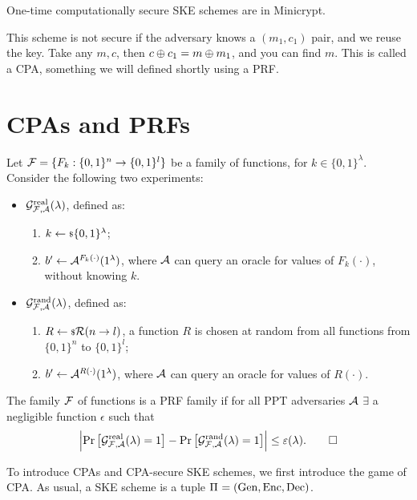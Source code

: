 \begin{corollary}
	One-time computationally secure \ac{SKE} schemes are in Minicrypt.
\end{corollary}

This scheme is not secure if the adversary knows a $(m_1, c_1)$ pair, and we reuse the key.
Take any $m, c$, then $c \oplus c_1 = m \oplus m_1$, and you can find $m$.
This is called a \ac{CPA}, something we will defined shortly using a \ac{PRF}.

\section{\aclp{CPA} and \aclp{PRF}}

\begin{definition}
	Let $\mathcal{F} = \{ F_k : \{0,1\}^{n} \to \{0,1\}^{l} \}$ be a family of functions, for $k \in \{0,1\}^{\lambda}$.
	Consider the following two experiments:
	\begin{itemize}
		\item $\mathcal{G}^{\scriptstyle \text{real}}_{\mathcal{F}, \mathcal{A}}(\lambda)$, defined as:
			\begin{enumerate}
				\item $k \leftarrow {\scriptstyle \$} {\{0,1\}^{\lambda}}$;
				\item $b' \leftarrow \mathcal{A}^{F_k(\cdot)}(1^{\lambda})$, where $\mathcal{A}$ can query an oracle for values of $F_k(\cdot)$, without knowing $k$.
			\end{enumerate}
		\item $\mathcal{G}^{\scriptstyle \text{rand}}_{\mathcal{F}, \mathcal{A}}(\lambda)$, defined as:
			\begin{enumerate}
				\item $R \leftarrow {\scriptstyle \$} {\mathcal{R}(n \to l)}$, \ie a function $R$ is chosen at random from all functions from $\{0,1\}^{n}$ to $\{0,1\}^{l}$;
				\item $b' \leftarrow \mathcal{A}^{R(\cdot)}(1^{\lambda})$, where $\mathcal{A}$ can query an oracle for values of $R(\cdot)$.
			\end{enumerate}
	\end{itemize}
	The family $\mathcal{F}$ of functions is a \ac{PRF} family if for all \ac{PPT} adversaries $\mathcal{A}$ $\exists$ a negligible function $\epsilon$ such that
	\begin{equation*}
		\left|{
			\mathop{\mathrm{Pr}}\limits_{} \left[ {\mathcal{G}^{\scriptstyle \text{real}}_{\mathcal{F}, \mathcal{A}}(\lambda) = 1} \right]
			-
			\mathop{\mathrm{Pr}}\limits_{} \left[ {\mathcal{G}^{\scriptstyle \text{rand}}_{\mathcal{F}, \mathcal{A}}(\lambda) = 1} \right]
		}\right|
		\le \varepsilon(\lambda). \qedhere
	\end{equation*}
\end{definition}

To introduce \acp{CPA} and \ac{CPA}-secure \ac{SKE} schemes, we first introduce the game of \ac{CPA}.
As usual, a \ac{SKE} scheme is a tuple $\Pi_{} = \left( \mathrm{Gen} , \allowbreak \mathrm{Enc} , \allowbreak \mathrm{Dec} \right)$.

